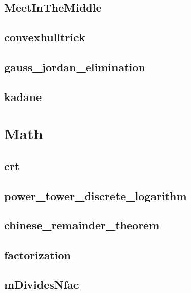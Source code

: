 \subsection{MeetInTheMiddle}
\raggedbottom
\hrulefill
\subsection{convexhulltrick}
\raggedbottom
\hrulefill
\subsection{gauss_jordan_elimination}
\raggedbottom
\hrulefill
\subsection{kadane}
\raggedbottom
\hrulefill

\section{Math}
\subsection{crt}
\raggedbottom
\hrulefill
\subsection{power_tower_discrete_logarithm}
\raggedbottom
\hrulefill
\subsection{chinese_remainder_theorem}
\raggedbottom
\hrulefill
\subsection{factorization}
\raggedbottom
\hrulefill
\subsection{mDividesNfac}
\raggedbottom
\hrulefill
